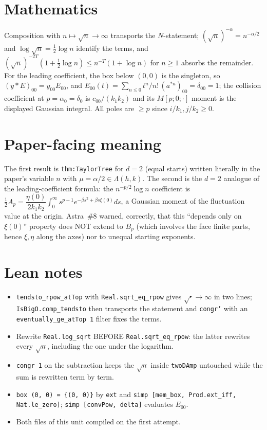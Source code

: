 \documentclass[11pt]{article}
\begin{document}
\section{Mathematics}

Composition with $n\mapsto\sqrt n\to\infty$ transports the $N$-statement; $(\sqrt n)^{-\alpha}=n^{-\alpha/2}$
and $\log\sqrt n=\tfrac12\log n$ identify the terms, and $(\sqrt n)^{-2T}(1+\tfrac12\log n)\le n^{-T}(1+\log n)$
for $n\ge1$ absorbs the remainder. For the leading coefficient, the box below $(0,0)$ is the
singleton, so $(y*E)_{00}=y_{00}E_{00}$, and $E_{00}(t)=\sum_{n\le0}t^n/n!\,(a^{*n})_{00}=\delta_{00}=1$;
the collision coefficient at $p=\alpha_0=\delta_0$ is $c_{00}/(k_1k_2)$ and its $M[p;0;\cdot]$
moment is the displayed Gaussian integral. All poles are $\ge p$ since $i/k_1,j/k_2\ge0$.

\section{Paper-facing meaning}

The first result is \texttt{thm:TaylorTree} for $d=2$ (equal starts) written literally in the
paper's variable $n$ with $\mu=\alpha/2\in\Lambda(h,k)$. The second is the $d=2$ analogue of the
leading-coefficient formula: the $n^{-p/2}\log n$ coefficient is
$\tfrac12A_p=\dfrac{\eta(0)}{2k_1k_2}\int_0^\infty s^{p-1}e^{-\beta s^2+\beta s\xi(0)}ds$, a Gaussian
moment of the fluctuation value at the origin. Astra~\#8 warned, correctly, that this
``depends only on $\xi(0)$'' property does NOT extend to $B_p$ (which involves the face finite
parts, hence $\xi,\eta$ along the axes) nor to unequal starting exponents.

\section{Lean notes}

\begin{itemize}
\item \texttt{tendsto\_rpow\_atTop} with \texttt{Real.sqrt\_eq\_rpow} gives
$\sqrt{\cdot}\to\infty$ in two lines; \texttt{IsBigO.comp\_tendsto} then transports the statement
and \texttt{congr'} with an \texttt{eventually\_ge\_atTop 1} filter fixes the terms.
\item Rewrite \texttt{Real.log\_sqrt} BEFORE \texttt{Real.sqrt\_eq\_rpow}: the latter rewrites
every $\sqrt n$, including the one under the logarithm.
\item \texttt{congr 1} on the subtraction keeps the $\sqrt n$ inside \texttt{twoDAmp} untouched
while the sum is rewritten term by term.
\item \texttt{box (0, 0) = \{(0, 0)\}} by \texttt{ext} and \texttt{simp [mem\_box, Prod.ext\_iff,
Nat.le\_zero]}; \texttt{simp [convPow, delta]} evaluates $E_{00}$.
\item Both files of this unit compiled on the first attempt.
\end{itemize}
\end{document}
